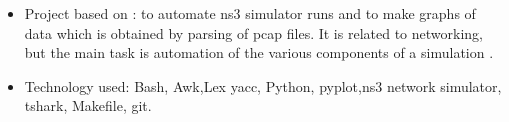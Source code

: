 \begin{itemize}
\begin{itemize}
	 \item Project based on : to automate ns3 simulator runs and to make graphs of data which is obtained by parsing of pcap
files. It is related to networking, but the main task is automation of the various components of a simulation .
	 \item Technology used: Bash, Awk,Lex yacc, Python, pyplot,ns3 network simulator, tshark, Makefile, git.
	\end{itemize}

		
\end{itemize}
